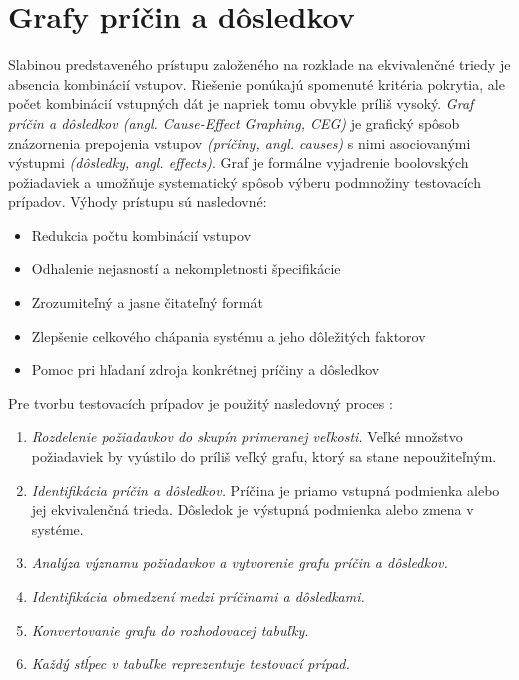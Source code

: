 \section{Grafy príčin a dôsledkov}
\label{ceg}
Slabinou predstaveného prístupu založeného na rozklade na ekvivalenčné triedy je absencia kombinácií vstupov. Riešenie ponúkajú spomenuté kritéria pokrytia, ale počet kombinácií vstupných dát je napriek tomu obvykle príliš vysoký. \textit{Graf príčin a dôsledkov (angl. Cause-Effect Graphing, CEG)} je grafický spôsob znázornenia prepojenia vstupov \textit{(príčiny, angl. causes)} s nimi asociovanými výstupmi \textit{(dôsledky, angl. effects)}. Graf je formálne vyjadrenie boolovských požiadaviek a umožňuje systematický spôsob výberu podmnožiny testovacích prípadov. 
Výhody prístupu sú nasledovné:
\begin{itemize}
	\item{ Redukcia počtu kombinácií vstupov
	}
	\item{ Odhalenie nejasností a nekompletnosti špecifikácie
	}
	\item{ Zrozumiteľný a jasne čitateľný formát
	}
	\item{ Zlepšenie celkového chápania systému a jeho dôležitých faktorov 
	} 	
	\item{ Pomoc pri hľadaní zdroja konkrétnej príčiny a dôsledkov  
	} 	
\end{itemize}
Pre tvorbu testovacích prípadov je použitý nasledovný proces \cite{Ast}:
\begin{enumerate}
	\item{ \textit{Rozdelenie požiadavkov do skupín primeranej veľkosti.} Veľké množstvo požiadaviek by vyústilo do príliš veľký grafu, ktorý sa stane nepoužiteľným. 
	}
	\item{ \textit{Identifikácia príčin a dôsledkov.} Príčina je priamo vstupná podmienka alebo jej ekvivalenčná trieda. Dôsledok je výstupná podmienka alebo zmena v systéme.  
	} 	
	\item{ \textit{Analýza významu požiadavkov a vytvorenie grafu príčin a dôsledkov.} 
	} 
	\item{ \textit{Identifikácia obmedzení medzi príčinami a dôsledkami.} 
	} 
	\item{ \textit{Konvertovanie grafu do rozhodovacej tabuľky.} 
	}  	
	\item{ \textit{Každý stĺpec v tabuľke reprezentuje testovací prípad.}
	}  		
\end{enumerate}

